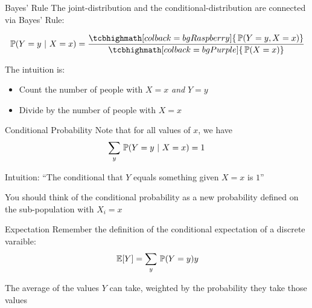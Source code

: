 \documentclass[aspectratio=169,t,11pt,table]{beamer}
\begin{document}
\begin{frame}{Bayes' Rule}
  The joint-distribution and the conditional-distribution are connected via \alert{Bayes' Rule}:

  \bigskip
  $$
    \prob{Y = y}{X = x} = \frac{
      \tcbhighmath[colback = bgRaspberry]{\prob{Y = y, X = x}}
    }{
      \tcbhighmath[colback = bgPurple]{\prob{X = x}}
    }
  $$
  

  \bigskip
  The intuition is:
  \begin{itemize}
    \item Count the number of people with $X = x$ \emph{and} $Y = y$ 
    
    \item Divide by the number of people with $X = x$
  \end{itemize}
\end{frame}

\begin{frame}{Conditional Probability}
  Note that for all values of $x$, we have
  $$
    \sum_{y} \prob{Y = y}{X = x} = 1
  $$

  \bigskip
  Intuition: ``The conditional that $Y$ equals something given $X = x$ is $1$''

  \pause
  \bigskip
  You should think of the conditional probability as a new probability defined on the sub-population with $X_i = x$
\end{frame}

\begin{frame}{Expectation}
  Remember the definition of the conditional expectation of a discrete varaible:
  $$
    \expec{Y} = \sum_y \prob{Y = y} y 
  $$
  
  \bigskip
  The average of the values $Y$ can take, weighted by the probability they take those values
\end{frame}
\end{document}
